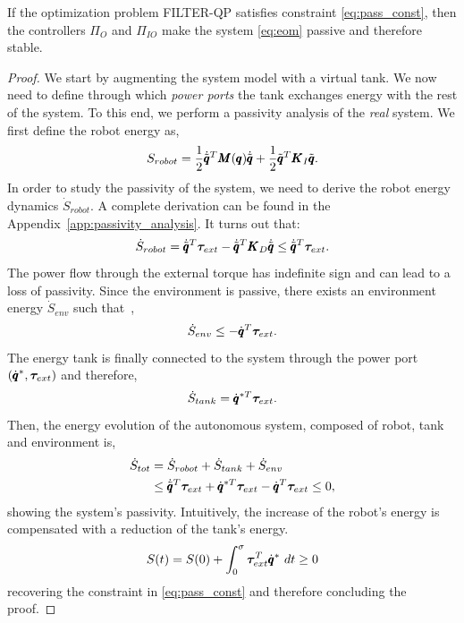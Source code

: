 \begin{theorem}
If the optimization problem FILTER-QP satisfies constraint \eqref{eq:pass_const}, then the controllers $\Pi_O$ and $\Pi_{IO}$ make the system \eqref{eq:eom} passive and therefore stable. 
\end{theorem}


\begin{proof}
We start by augmenting the system model with a virtual tank. We now need to define through which \emph{power ports} the tank exchanges energy with the rest of the system. To this end, we perform a passivity analysis of the \emph{real} system. We first define the robot energy as, 
\begin{equation}
    S_{robot} = \frac{1}{2} \dot{\tilde{\pmb{q}}}^T \pmb{M}(\pmb{q}) \dot{\tilde{\pmb{q}}} + \frac{1}{2} \tilde{\pmb{q}}^T \pmb{K}_I \tilde{\pmb{q}}.
\end{equation}
In order to study the passivity of the system, we need to derive the robot energy dynamics $\dot{S}_{robot}$. A complete derivation can be found in the Appendix~\ref{app:passivity_analysis}. It turns out that:
\begin{equation}
    \dot{S}_{robot} = \dot{\tilde{\pmb{q}}}^T \boldsymbol{\tau}_{ext} - \dot{\tilde{\pmb{q}}}^T \pmb{K}_D \dot{\tilde{\pmb{q}}} \leq \dot{\tilde{\pmb{q}}}^T \boldsymbol{\tau}_{ext}. 
\end{equation}
The power flow through the external torque has indefinite sign and can lead to a loss of passivity. Since the environment is passive, there exists an environment energy $\dot{S}_{env}$ such that~\cite{shahriari2018valve},
\begin{equation}
    \dot{S}_{env} \leq -\dot{\pmb{q}}^T \boldsymbol{\tau}_{ext}.
\end{equation}
The energy tank is finally connected to the system through the power port $(\dot{\pmb{q}}^*, \boldsymbol{\tau}_{ext})$ and therefore,
\begin{equation} \label{eq:tank_dynamics}
\dot{S}_{tank} = \dot{\pmb{q}}^{*T} \boldsymbol{\tau}_{ext}. 
\end{equation}
Then, the energy evolution of the autonomous system, composed of robot, tank and environment is,
\begin{equation}
\begin{aligned}
    \dot{S}_{tot} &= \dot{S}_{robot} + \dot{S}_{tank} + \dot{S}_{env} \\
    &\leq \dot{\tilde{\pmb{q}}}^T \boldsymbol{\tau}_{ext} + \dot{\pmb{q}}^{*T} \boldsymbol{\tau}_{ext} - \dot{\pmb{q}}^T \boldsymbol{\tau}_{ext} \leq 0,
\end{aligned}
\end{equation}
showing the system's passivity.
Intuitively, the increase of the robot's energy is compensated with a reduction of the tank's energy. 
\begin{equation}
    S(t) = S(0) + \int_{0}^{\sigma} \boldsymbol{\tau}_{ext}^T \dconfigRobotDesired \ dt  \geq 0
\end{equation}
recovering the constraint in \eqref{eq:pass_const} and therefore concluding the proof.
\end{proof}
